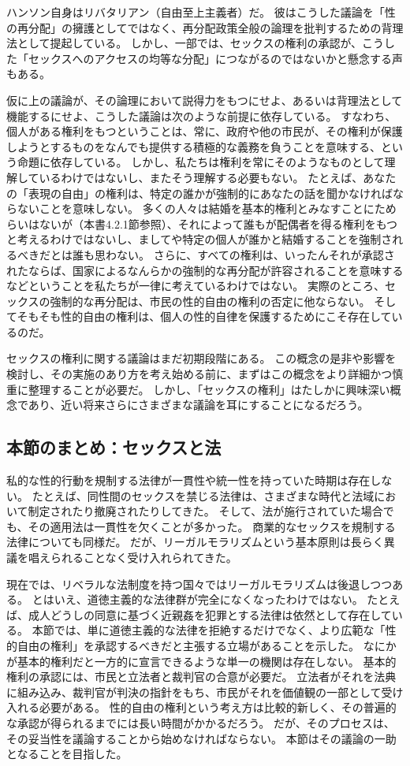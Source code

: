 \documentclass[paper=a4,book,openany]{jlreq} \usepackage{mystyle}
\begin{document}
ハンソン自身はリバタリアン（自由至上主義者）だ。
彼はこうした議論を「性の再分配」の擁護としてではなく、再分配政策全般の論理を批判するための背理法として提起している。
しかし、一部では、セックスの権利の承認が、こうした「セックスへのアクセスの均等な分配」につながるのではないかと懸念する声もある。

仮に上の議論が、その論理において説得力をもつにせよ、あるいは背理法として機能するにせよ、こうした議論は次のような前提に依存している。
すなわち、個人がある権利をもつということは、常に、政府や他の市民が、その権利が保護しようとするものをなんでも提供する積極的な義務を負うことを意味する、という命題に依存している。
しかし、私たちは権利を常にそのようなものとして理解しているわけではないし、またそう理解する必要もない。
たとえば、あなたの「表現の自由」の権利は、特定の誰かが強制的にあなたの話を聞かなければならないことを意味しない。
多くの人々は結婚を基本的権利とみなすことにためらいはないが（本書4.2.1節参照）、それによって誰もが配偶者を得る権利をもつと考えるわけではないし、ましてや特定の個人が誰かと結婚することを強制されるべきだとは誰も思わない。
さらに、すべての権利は、いったんそれが承認されたならば、国家によるなんらかの強制的な再分配が許容されることを意味するなどということを私たちが一律に考えているわけではない。
実際のところ、セックスの強制的な再分配は、市民の性的自由の権利の否定に他ならない。
そしてそもそも性的自由の権利は、個人の性的自律を保護するためにこそ存在しているのだ。

セックスの権利に関する議論はまだ初期段階にある。
この概念の是非や影響を検討し、その実施のあり方を考え始める前に、まずはこの概念をより詳細かつ慎重に整理することが必要だ。
しかし、「セックスの権利」はたしかに興味深い概念であり、近い将来さらにさまざまな議論を耳にすることになるだろう。

\subsection{本節のまとめ：セックスと法}

私的な性的行動を規制する法律が一貫性や統一性を持っていた時期は存在しない。
たとえば、同性間のセックスを禁じる法律は、さまざまな時代と法域において制定されたり撤廃されたりしてきた。
そして、法が施行されていた場合でも、その適用法は一貫性を欠くことが多かった。
商業的なセックスを規制する法律についても同様だ。
だが、リーガルモラリズムという基本原則は長らく異議を唱えられることなく受け入れられてきた。

現在では、リベラルな法制度を持つ国々ではリーガルモラリズムは後退しつつある。
とはいえ、道徳主義的な法律群が完全になくなったわけではない。
たとえば、成人どうしの同意に基づく近親姦を犯罪とする法律は依然として存在している。
本節では、単に道徳主義的な法律を拒絶するだけでなく、より広範な「性的自由の権利」を承認するべきだと主張する立場があることを示した。
なにかが基本的権利だと一方的に宣言できるような単一の機関は存在しない。
基本的権利の承認には、市民と立法者と裁判官の合意が必要だ。
立法者がそれを法典に組み込み、裁判官が判決の指針をもち、市民がそれを価値観の一部として受け入れる必要がある。
性的自由の権利という考え方は比較的新しく、その普遍的な承認が得られるまでには長い時間がかかるだろう。
だが、そのプロセスは、その妥当性を議論することから始めなければならない。
本節はその議論の一助となることを目指した。
\end{document}

